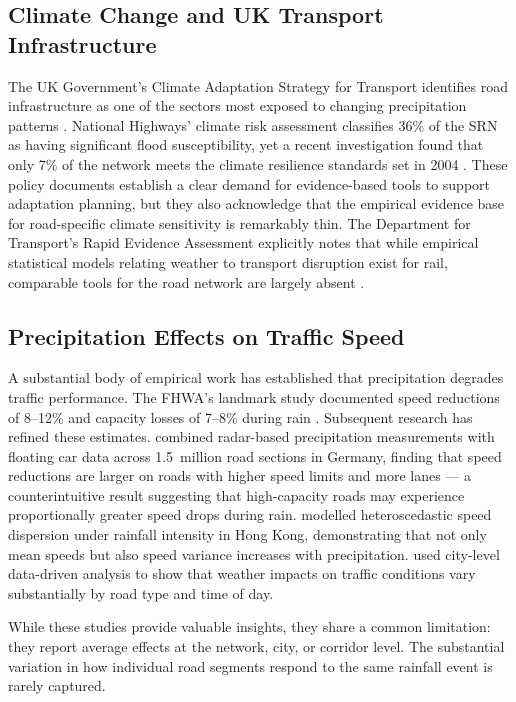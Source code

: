 \documentclass[review]{elsarticle}
\begin{document}
\subsection{Climate Change and UK Transport Infrastructure}
\label{sec:lit:climate}

The UK Government's Climate Adaptation Strategy for Transport identifies road infrastructure as one of the sectors most exposed to changing precipitation patterns \citep{dft2024rea}. National Highways' climate risk assessment classifies 36\% of the SRN as having significant flood susceptibility, yet a recent investigation found that only 7\% of the network meets the climate resilience standards set in 2004 \citep{nce2026srn,nh2024climate}. These policy documents establish a clear demand for evidence-based tools to support adaptation planning, but they also acknowledge that the empirical evidence base for road-specific climate sensitivity is remarkably thin. The Department for Transport's Rapid Evidence Assessment explicitly notes that while empirical statistical models relating weather to transport disruption exist for rail, comparable tools for the road network are largely absent \citep{dft2024rea}.

\subsection{Precipitation Effects on Traffic Speed}
\label{sec:lit:precip}

A substantial body of empirical work has established that precipitation degrades traffic performance. The FHWA's landmark study documented speed reductions of 8--12\% and capacity losses of 7--8\% during rain \citep{hranac2006empirical}. Subsequent research has refined these estimates. \citet{becker2026rainfall} combined radar-based precipitation measurements with floating car data across 1.5~million road sections in Germany, finding that speed reductions are larger on roads with higher speed limits and more lanes --- a counterintuitive result suggesting that high-capacity roads may experience proportionally greater speed drops during rain. \citet{cai2016rainfall} modelled heteroscedastic speed dispersion under rainfall intensity in Hong Kong, demonstrating that not only mean speeds but also speed variance increases with precipitation. \citet{bi2022weather} used city-level data-driven analysis to show that weather impacts on traffic conditions vary substantially by road type and time of day.

While these studies provide valuable insights, they share a common limitation: they report average effects at the network, city, or corridor level. The substantial variation in how individual road segments respond to the same rainfall event is rarely captured.
\end{document}
